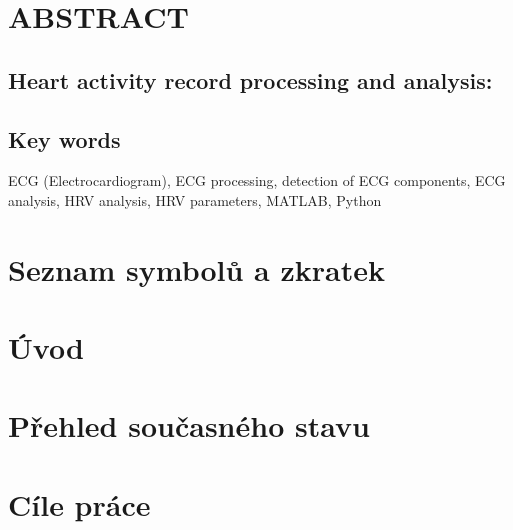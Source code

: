 \documentclass[a4paper,12pt,czech]{article}   %
\numberwithin{equation}{section}        %
\newcommand{\nazevENG}{Heart activity record processing and analysis}
\begin{document}
\null\vfill
\section*{ABSTRACT}
\subsection*{\nazevENG:}

\subsection*{Key words}
ECG (Electrocardiogram), ECG processing, detection of ECG components, ECG analysis, HRV analysis, HRV parameters, MATLAB, Python
\clearpage

\pagestyle{plain}	%

\tableofcontents			%

\clearpage

\section*{Seznam symbolů a zkratek} %

\clearpage






\section{Úvod}

\clearpage

\section{Přehled současného stavu}

\clearpage

\section{Cíle práce}

\clearpage
\end{document}
